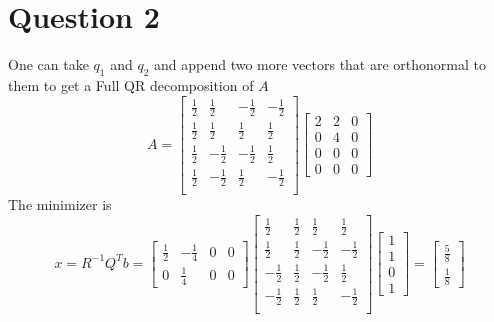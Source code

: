 \documentclass{article}
\newcommand{\inv}[1]{#1^{-1}}
\begin{document}
\section*{Question 2}
One can take $q_1$ and $q_2$ and append two more vectors that are orthonormal
to them to get a Full QR decomposition of $A$
\[
    A = 
    \begin{bmatrix}
        \frac{1}{2} &  \frac{1}{2} & -\frac{1}{2} & -\frac{1}{2}\\
        \frac{1}{2} &  \frac{1}{2} &  \frac{1}{2} & \frac{1}{2}\\
        \frac{1}{2} & -\frac{1}{2} & -\frac{1}{2} & \frac{1}{2}\\
        \frac{1}{2} & -\frac{1}{2} &  \frac{1}{2} & -\frac{1}{2}\\ 
    \end{bmatrix}
    \begin{bmatrix}
        2 & 2 & 0 \\
        0 & 4 & 0 \\
        0 & 0 & 0 \\
        0 & 0 & 0
    \end{bmatrix}
\]
The minimizer is 
\[
    x= \inv{R}Q^Tb
    = \begin{bmatrix}
        \frac{1}{2} & - \frac{1}{4} & 0 & 0\\
        0 & \frac{1}{4}  & 0 & 0
    \end{bmatrix}
    \begin{bmatrix}
        \frac{1}{2} &  \frac{1}{2} & \frac{1}{2} & \frac{1}{2}\\
        \frac{1}{2} &  \frac{1}{2} &  -\frac{1}{2} & -\frac{1}{2}\\
        -\frac{1}{2} & \frac{1}{2} & -\frac{1}{2} & \frac{1}{2}\\
        -\frac{1}{2} & \frac{1}{2} &  \frac{1}{2} & -\frac{1}{2}\\ 
    \end{bmatrix}
    \begin{bmatrix}
        1 \\ 1 \\ 0 \\ 1
    \end{bmatrix}
    = \begin{bmatrix}
        \frac{5}{8} \\ \frac{1}{8}
    \end{bmatrix}
\]
\newpage 
\end{document}
